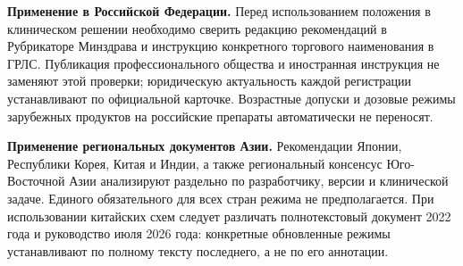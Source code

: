 \documentclass[11pt,a4paper,notitlepage]{report}
\newcommand{\src}[1]{\unskip\space\cite{#1}}
\begin{document}
\textbf{Применение в Российской Федерации.} Перед использованием положения в клиническом решении необходимо сверить редакцию рекомендаций в Рубрикаторе Минздрава и инструкцию конкретного торгового наименования в ГРЛС. Публикация профессионального общества и иностранная инструкция не заменяют этой проверки; юридическую актуальность каждой регистрации устанавливают по официальной карточке. Возрастные допуски и дозовые режимы зарубежных продуктов на российские препараты автоматически не переносят.\src{registry,grls}

\textbf{Применение региональных документов Азии.} Рекомендации Японии, Республики Корея, Китая и Индии, а также региональный консенсус Юго-Восточной Азии анализируют раздельно по разработчику, версии и клинической задаче. Единого обязательного для всех стран режима не предполагается. При использовании китайских схем следует различать полнотекстовый документ 2022 года и руководство июля 2026 года: конкретные обновленные режимы устанавливают по полному тексту последнего, а не по его аннотации.\src{china2026}
\end{document}
